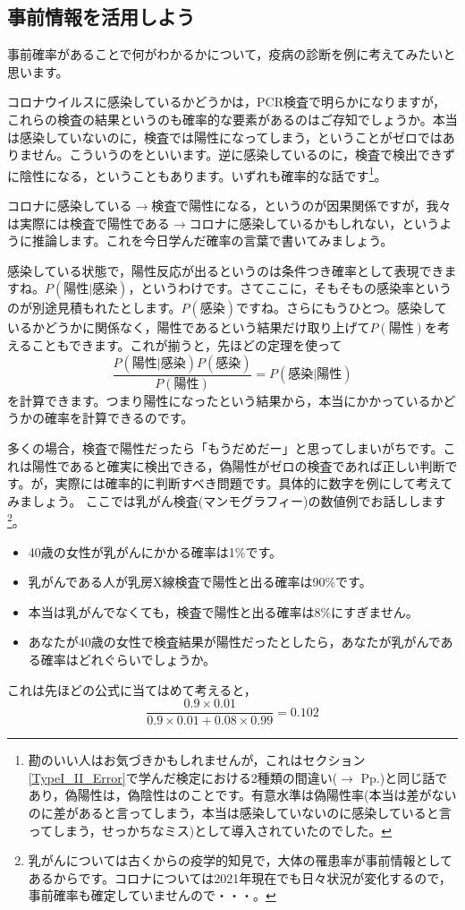 \documentclass{ltjbook}
\begin{document}
\subsection{事前情報を活用しよう}
事前確率があることで何がわかるかについて，疫病の診断を例に考えてみたいと思います。

コロナウイルスに感染しているかどうかは，PCR検査で明らかになりますが，これらの検査の結果というのも確率的な要素があるのはご存知でしょうか。本当は感染していないのに，検査では陽性になってしまう，ということがゼロではありません。こういうのをといいます。逆に感染しているのに，検査で検出できずに陰性になる，ということもあります。いずれも確率的な話です\footnote{勘のいい人はお気づきかもしれませんが，これはセクション\ref{TypeI_II_Error}で学んだ検定における2種類の間違い($\to$ Pp.\pageref{TypeI_II_Error})と同じ話であり，偽陽性は，偽陰性はのことです。有意水準は偽陽性率(本当は差がないのに差があると言ってしまう，本当は感染していないのに感染していると言ってしまう，せっかちなミス)として導入されていたのでした。}。

コロナに感染している$\to$検査で陽性になる，というのが因果関係ですが，我々は実際には検査で陽性である$\to$コロナに感染しているかもしれない，というように推論します。これを今日学んだ確率の言葉で書いてみましょう。

感染している状態で，陽性反応が出るというのは条件つき確率として表現できますね。$P(\mbox{陽性}|\mbox{感染})$，というわけです。さてここに，そもそもの感染率というのが別途見積もれたとします。$P(\mbox{感染})$ですね。さらにもうひとつ。感染しているかどうかに関係なく，陽性であるという結果だけ取り上げて$P(\mbox{陽性})$を考えることもできます。これが揃うと，先ほどの定理を使って
\[ \frac{P(\mbox{陽性}|\mbox{感染})P(\mbox{感染})}{P(\mbox{陽性})} = P(\mbox{感染}|\mbox{陽性})\]
を計算できます。つまり陽性になったという結果から，本当にかかっているかどうかの確率を計算できるのです。

多くの場合，検査で陽性だったら「もうだめだー」と思ってしまいがちです。これは陽性であると確実に検出できる，偽陽性がゼロの検査であれば正しい判断です。が，実際には確率的に判断すべき問題です。具体的に数字を例にして考えてみましょう。
ここでは乳がん検査(マンモグラフィー)の数値例でお話しします\footnote{乳がんについては古くからの疫学的知見で，大体の罹患率が事前情報としてあるからです。コロナについては2021年現在でも日々状況が変化するので，事前確率も確定していませんので・・・。}。
\begin{itemize}
    \item 40歳の女性が乳がんにかかる確率は1\%です。
    \item 乳がんである人が乳房X線検査で陽性と出る確率は90\%です。
    \item 本当は乳がんでなくても，検査で陽性と出る確率は8\%にすぎません。
    \item あなたが40歳の女性で検査結果が陽性だったとしたら，あなたが乳がんである確率はどれぐらいでしょうか。
\end{itemize}
これは先ほどの公式に当てはめて考えると，
\[\frac{0.9\times0.01}{0.9\times0.01+0.08\times0.99}=0.102 \]
\end{document}
